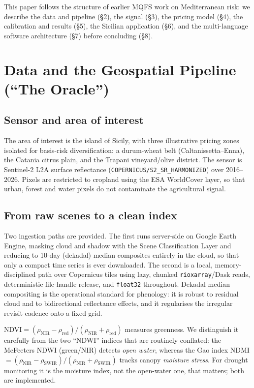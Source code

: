 \documentclass[11pt]{article}
\begin{document}
This paper follows the structure of earlier MQFS work on Mediterranean risk: we
describe the data and pipeline (\S2), the signal (\S3), the pricing model (\S4),
the calibration and results (\S5), the Sicilian application (\S6), and the
multi-language software architecture (\S7) before concluding (\S8).

\section{Data and the Geospatial Pipeline (``The Oracle'')}
\subsection{Sensor and area of interest}
The area of interest is the island of Sicily, with three illustrative pricing
zones isolated for basis-risk diversification: a durum-wheat belt
(Caltanissetta--Enna), the Catania citrus plain, and the Trapani
vineyard/olive district. The sensor is Sentinel-2 L2A surface reflectance
(\texttt{COPERNICUS/S2\_SR\_HARMONIZED}) over 2016--2026. Pixels are restricted to
cropland using the ESA WorldCover layer, so that urban, forest and water pixels
do not contaminate the agricultural signal.

\subsection{From raw scenes to a clean index}
Two ingestion paths are provided. The first runs server-side on Google Earth
Engine, masking cloud and shadow with the Scene Classification Layer and reducing
to 10-day (dekadal) median composites entirely in the cloud, so that only a
compact time series is ever downloaded. The second is a local, memory-disciplined
path over Copernicus tiles using lazy, chunked \texttt{rioxarray}/Dask reads,
deterministic file-handle release, and \texttt{float32} throughout. Dekadal
median compositing is the operational standard for phenology: it is robust to
residual cloud and to bidirectional reflectance effects, and it regularises the
irregular revisit cadence onto a fixed grid.

\begin{keybox}[title=NDVI and the water indices]
NDVI${}=(\rho_{\text{NIR}}-\rho_{\text{red}})/(\rho_{\text{NIR}}+\rho_{\text{red}})$
measures greenness. We distinguish it carefully from the two ``NDWI'' indices that
are routinely conflated: the McFeeters NDWI (green/NIR) detects \emph{open water},
whereas the Gao index NDMI${}=(\rho_{\text{NIR}}-\rho_{\text{SWIR}})/(\rho_{\text{NIR}}+\rho_{\text{SWIR}})$
tracks canopy \emph{moisture stress}. For drought monitoring it is the moisture
index, not the open-water one, that matters; both are implemented.
\end{keybox}
\end{document}
